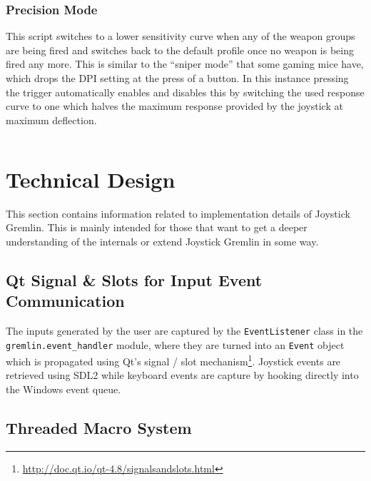 \documentclass[a4, 10pt]{article}
\newcommand{\JG}{Joystick Gremlin}
\begin{document}
\inputminted[xleftmargin=2em]{python}{examples/mode_switching.py}


\subsubsection{Precision Mode}

This script switches to a lower sensitivity curve when any of the
weapon groups are being fired and switches back to the default profile
once no weapon is being fired any more. This is similar to the ``sniper
mode'' that some gaming mice have, which drops the DPI setting at the
press of a button. In this instance pressing the trigger automatically
enables and disables this by switching the used response curve to one
which halves the maximum response provided by the joystick at maximum
deflection.

\inputminted[xleftmargin=2em]{python}{examples/precision_mode.py}



\section{Technical Design}
\label{sec:technical_design}

This section contains information related to implementation details of
\JG{}. This is mainly intended for those that want to get a deeper
understanding of the internals or extend \JG{} in some way.


\subsection{Qt Signal \& Slots for Input Event Communication}

The inputs generated by the user are captured by the
\verb+EventListener+ class in the \verb+gremlin.event_handler+ module,
where they are turned into an \verb+Event+ object which is propagated
using Qt's signal / slot
mechanism\footnote{\url{http://doc.qt.io/qt-4.8/signalsandslots.html}}.
Joystick events are retrieved using SDL2 while keyboard events are
capture by hooking directly into the Windows event queue.


\subsection{Threaded Macro System}
\end{document}
